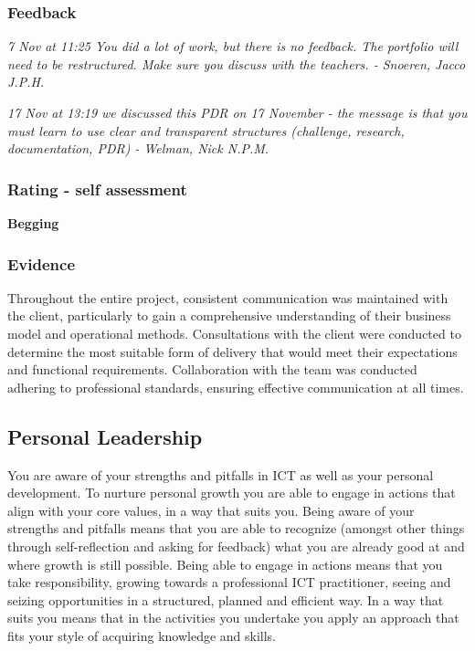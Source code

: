 \documentclass[a4paper, 11pt]{article}
\begin{document}
\subsubsection{Feedback}

\begin{mdframed}[backgroundcolor=gray!20, linecolor=black, linewidth=0pt, leftmargin=1cm, rightmargin=1cm, innertopmargin=10pt, innerbottommargin=10pt]
  \itshape
  7 Nov at 11:25 \smallbreak
  You did a lot of work, but there is no feedback. The portfolio will need to be restructured. Make sure you discuss with the teachers.\smallbreak
- Snoeren, Jacco J.P.H.
\end{mdframed}

\begin{mdframed}[backgroundcolor=gray!20, linecolor=black, linewidth=0pt, leftmargin=1cm, rightmargin=1cm, innertopmargin=10pt, innerbottommargin=10pt]
  \itshape
  17 Nov at 13:19 \smallbreak
  we discussed this PDR on 17 November - the message is that you must learn to use clear and transparent structures (challenge, research, documentation, PDR)\smallbreak
- Welman, Nick N.P.M.
\end{mdframed}

\subsubsection{Rating - self assessment}
\textbf{Begging} 
\subsubsection{Evidence} 
Throughout the entire project, consistent communication was maintained with the client, particularly to gain a comprehensive understanding of their business model and operational methods. Consultations with the client were conducted to determine the most suitable form of delivery that would meet their expectations and functional requirements. Collaboration with the team was conducted adhering to professional standards, ensuring effective communication at all times.




\subsection{Personal Leadership}
You are aware of your strengths and pitfalls in ICT as well as your personal development. To nurture personal growth you are able to engage in actions that align with your core values, in a way that suits you.
\medbreak
Being aware of your strengths and pitfalls means that you are able to recognize (amongst other things through self-reflection and asking for feedback) what you are already good at and where growth is still possible.   Being able to engage in actions means that you take responsibility, growing towards a professional ICT practitioner, seeing and seizing opportunities in a structured, planned and efficient way. In a way that suits you means that in the activities you undertake you apply an approach that fits your style of acquiring knowledge and skills. 
\end{document}
